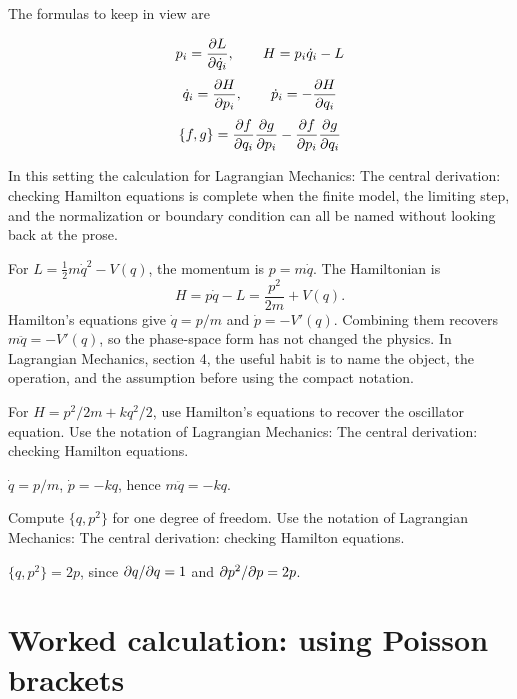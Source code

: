 The formulas to keep in view are

\[
  p_i=\frac{\partial L}{\partial\dot q_i},\qquad H=p_i\dot q_i-L
\]
\[
  \dot q_i=\frac{\partial H}{\partial p_i},\qquad \dot p_i=-\frac{\partial H}{\partial q_i}
\]
\[
  \{f,g\}=\frac{\partial f}{\partial q_i}\frac{\partial g}{\partial p_i}-\frac{\partial f}{\partial p_i}\frac{\partial g}{\partial q_i}
\]

In this setting the calculation for Lagrangian Mechanics: The central derivation: checking Hamilton equations is complete when the finite model, the limiting step, and the normalization or boundary condition can all be named without looking back at the prose.




\begin{example}
For \(L=\frac12m\dot q^2-V(q)\), the momentum is \(p=m\dot q\).  The Hamiltonian is
\[
  H=p\dot q-L=\frac{p^2}{2m}+V(q).
\]
Hamilton's equations give \(\dot q=p/m\) and \(\dot p=-V'(q)\).  Combining them recovers \(m\ddot q=-V'(q)\), so the phase-space form has not changed the physics.  In Lagrangian Mechanics, section 4, the useful habit is to name the object, the operation, and the assumption before using the compact notation.
\end{example}



\begin{exercise}
For \(H=p^2/2m+kq^2/2\), use Hamilton's equations to recover the oscillator equation.  Use the notation of Lagrangian Mechanics: The central derivation: checking Hamilton equations.
\begin{answer}
\(\dot q=p/m\), \(\dot p=-kq\), hence \(m\ddot q=-kq\).
\end{answer}
\end{exercise}

\begin{exercise}
Compute \(\{q,p^2\}\) for one degree of freedom.  Use the notation of Lagrangian Mechanics: The central derivation: checking Hamilton equations.
\begin{answer}
\(\{q,p^2\}=2p\), since \(\partial q/\partial q=1\) and \(\partial p^2/\partial p=2p\).
\end{answer}
\end{exercise}



\section{Worked calculation: using Poisson brackets}

